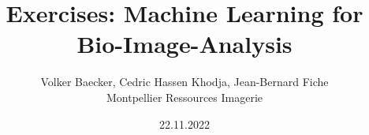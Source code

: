 \documentclass{book}
\begin{document}
\title{Exercises: Machine Learning for Bio-Image-Analysis}
\author{Volker Baecker, Cedric Hassen Khodja, Jean-Bernard Fiche\\Montpellier Ressources Imagerie}
\date{22.11.2022}
\maketitle
\tableofcontents
\listoffigures




\end{document}
